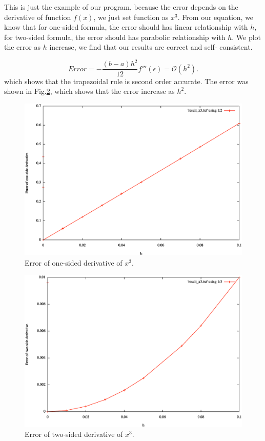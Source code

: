 \documentclass{article}
\begin{document}
This is just the example of our program, because the error depends on the derivative of function $f(x)$, we just set function as $x^3$. From our equation, we know that for one-sided formula, the error should has linear relationship with $h$, for two-sided formula, the error should has parabolic relationship with $h$. We plot the error as $h$ increase, we find that our results are correct and self- consistent.
 
\begin{equation}
Error = -\frac{(b - a)h^2}{12}f'''(\epsilon) =  \mathcal{O}(h^2).
\end{equation}
which shows that the trapezoidal rule is second order accurate. The error was shown in Fig.{\ref{2point}}, which shows that the error increase as $h^2$.
\begin{figure}
    \centering
    \includegraphics[width=4.7in]{x3_1point.eps}
    \caption{Error of one-sided derivative of $x^3$.}
    \label{1point}
\end{figure}
\begin{figure}
    \centering
    \includegraphics[width=4.7in]{x3_2point.eps}
    \caption{Error of two-sided derivative of $x^3$.}
    \label{2point}
\end{figure}
\end{document}
